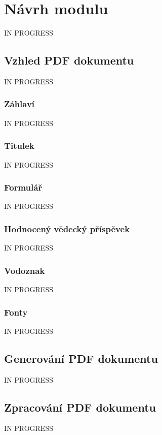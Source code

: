 \chapter{Návrh modulu}
IN PROGRESS

\section{Vzhled PDF dokumentu}
IN PROGRESS

\subsection{Záhlaví}
IN PROGRESS

\subsection{Titulek}
IN PROGRESS

\subsection{Formulář}
IN PROGRESS

\subsection{Hodnocený vědecký příspěvek}
IN PROGRESS

\subsection{Vodoznak}
IN PROGRESS

\subsection{Fonty}
IN PROGRESS


\section{Generování PDF dokumentu}
IN PROGRESS


\section{Zpracování PDF dokumentu}
IN PROGRESS